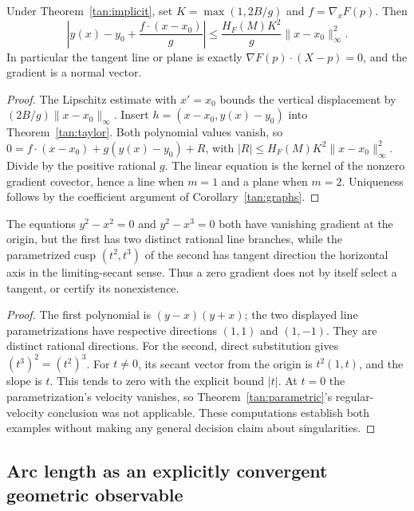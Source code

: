 \begin{corollary}
\label{tan:implicit-tangent}
Under Theorem~\ref{tan:implicit}, set $K=\max(1,2B/g)$ and
$f=\nabla_xF(p)$. Then
\[
 \left|y(x)-y_0+\frac{f\cdot(x-x_0)}{g}\right|
 \le \frac{H_F(M)K^2}{g}\|x-x_0\|_\infty^2.
\]
In particular the tangent line or plane is exactly
$\nabla F(p)\cdot(X-p)=0$, and the gradient is a normal vector.
\end{corollary}
\begin{proof}
The Lipschitz estimate with $x'=x_0$ bounds the vertical displacement by
$(2B/g)\|x-x_0\|_\infty$. Insert
$h=(x-x_0,y(x)-y_0)$ into Theorem~\ref{tan:taylor}. Both polynomial
values vanish, so
$0=f\cdot(x-x_0)+g(y(x)-y_0)+R$, with
$|R|\le H_F(M)K^2\|x-x_0\|_\infty^2$. Divide by the positive
rational $g$. The linear equation is the kernel of the nonzero
gradient covector, hence a line when $m=1$ and a plane when $m=2$.
Uniqueness follows by the coefficient argument of
Corollary~\ref{tan:graphs}.
\end{proof}

\begin{proposition}
\label{tan:singular}
The equations $y^2-x^2=0$ and $y^2-x^3=0$ both have vanishing gradient
at the origin, but the first has two distinct rational line branches,
while the parametrized cusp $(t^2,t^3)$ of the second has tangent
direction the horizontal axis in the limiting-secant sense. Thus a
zero gradient does not by itself select a tangent, or certify its
nonexistence.
\end{proposition}
\begin{proof}
The first polynomial is $(y-x)(y+x)$; the two displayed line
parametrizations have respective directions $(1,1)$ and $(1,-1)$.
They are distinct rational directions. For the second, direct
substitution gives $(t^3)^2=(t^2)^3$. For $t\ne0$, its secant vector
from the origin is $t^2(1,t)$, and the slope is $t$. This tends to zero
with the explicit bound $|t|$. At $t=0$ the parametrization's velocity
vanishes, so Theorem~\ref{tan:parametric}'s regular-velocity conclusion
was not applicable. These computations establish both examples without
making any general decision claim about singularities.
\end{proof}

\subsection{Arc length as an explicitly convergent geometric observable}

